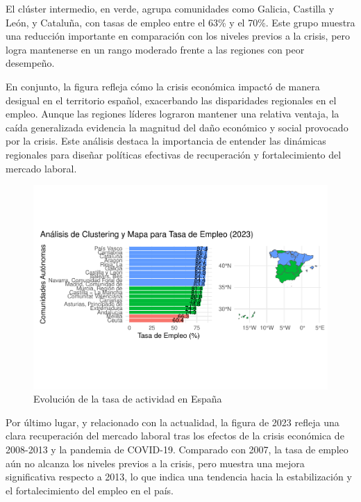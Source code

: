 \documentclass[notspecified,article,submit,moreauthors,pdftex]{Definitions/mdpi}
\begin{document}
El clúster intermedio, en verde, agrupa comunidades como Galicia,
Castilla y León, y Cataluña, con tasas de empleo entre el 63\% y el
70\%. Este grupo muestra una reducción importante en comparación con los
niveles previos a la crisis, pero logra mantenerse en un rango moderado
frente a las regiones con peor desempeño.

En conjunto, la figura refleja cómo la crisis económica impactó de
manera desigual en el territorio español, exacerbando las disparidades
regionales en el empleo. Aunque las regiones líderes lograron mantener
una relativa ventaja, la caída generalizada evidencia la magnitud del
daño económico y social provocado por la crisis. Este análisis destaca
la importancia de entender las dinámicas regionales para diseñar
políticas efectivas de recuperación y fortalecimiento del mercado
laboral.

\begin{figure}[h]

{\centering \includegraphics[width=1\linewidth]{ProyectoAED2024_files/figure-latex/unnamed-chunk-37-1} 

}

\caption{Evolución de la tasa de actividad en España}\label{fig:unnamed-chunk-37}
\end{figure}

Por último lugar, y relacionado con la actualidad, la figura de 2023
refleja una clara recuperación del mercado laboral tras los efectos de
la crisis económica de 2008-2013 y la pandemia de COVID-19. Comparado
con 2007, la tasa de empleo aún no alcanza los niveles previos a la
crisis, pero muestra una mejora significativa respecto a 2013, lo que
indica una tendencia hacia la estabilización y el fortalecimiento del
empleo en el país.
\end{document}
